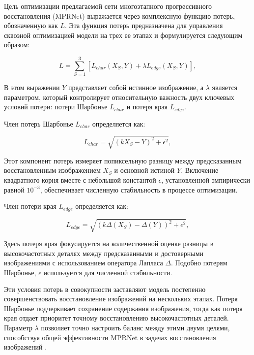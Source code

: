Цель оптимизации предлагаемой сети многоэтапного прогрессивного восстановления (MPRNet) выражается через комплексную функцию потерь, обозначенную как \(L \). Эта функция потерь предназначена для управления сквозной оптимизацией модели на трех ее этапах и формулируется следующим образом:

\begin{equation}
	L = \sum_{S=1}^{3} [L_{char}(X_S, Y) + \lambda L_{edge}(X_S, Y)],
\end{equation}

В этом выражении \( Y \) представляет собой истинное изображение, а \( \lambda \) является параметром, который контролирует относительную важность двух ключевых условий потери: потери Шарбонье \( L_{char} \) и потеря края \( L_{edge} \).

Член потерь Шарбонье \( L_{char} \) определяется как:

\begin{equation}
	L_{char} = \sqrt{(kX_S - Y)^2 + \epsilon^2},
\end{equation}

Этот компонент потерь измеряет попиксельную разницу между предсказанным восстановленным изображением \( X_S \) и основной истиной \( Y \). Включение квадратного корня вместе с небольшой константой \( \epsilon \), установленной эмпирически равной \( 10^{-3} \), обеспечивает численную стабильность в процессе оптимизации.

Член потери края \( L_{edge} \) определяется как:

\begin{equation}
	L_{edge} = \sqrt{(k\Delta(X_S) - \Delta(Y))^2 + \epsilon^2},
\end{equation}

Здесь потеря края фокусируется на количественной оценке разницы в высокочастотных деталях между предсказанными и достоверными изображениями с использованием оператора Лапласа \(\Delta\). Подобно потерям Шарбонье, \( \epsilon \) используется для численной стабильности.

Эти условия потерь в совокупности заставляют модель постепенно совершенствовать восстановление изображений на нескольких этапах. Потеря Шарбонье подчеркивает сохранение содержания изображения, тогда как потеря края отдает приоритет точному восстановлению высокочастотных деталей. Параметр \( \lambda \) позволяет точно настроить баланс между этими двумя целями, способствуя общей эффективности MPRNet в задачах восстановления изображений \cite{zamir2021multi}.

